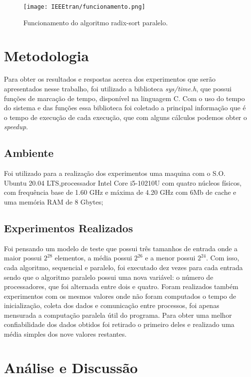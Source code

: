 \documentclass[journal]{IEEEtran}
\begin{document}
\begin{figure}[b]
    \centering
    \texttt{[image: IEEEtran/funcionamento.png]}
    \caption{Funcionamento do algoritmo radix-sort paralelo.}
    \label{fig:radix-paralel}
\end{figure}


\section{Metodologia}
\label{chapter:metodologia}


Para obter os resultados e respostas acerca dos experimentos que serão apresentados nesse trabalho, foi utilizado a biblioteca \textit{sys/time.h}, que possui funções de marcação de tempo, disponível na linguagem C. Com o uso do tempo do sistema e das funções essa biblioteca foi coletado a principal informação que é o tempo de execução de cada execução, que com alguns cálculos podemos obter o \textit{speedup}.

\subsection{Ambiente}
Foi utilizado para a realização dos experimentos uma maquina com o S.O. Ubuntu 20.04 LTS,processador Intel Core i5-10210U com quatro núcleos físicos, com frequência base de 1.60 GHz e máxima de 4.20 GHz com 6Mb de cache e uma memória RAM de 8 Gbytes;

\subsection{Experimentos Realizados}

Foi pensando um modelo de teste que possui três tamanhos de entrada onde a maior possui $2^28$ elementos, a média possui $2^26$ e a menor possui $2^24$. Com isso, cada algoritmo, sequencial e paralelo, foi executado dez vezes para cada entrada sendo que o algoritmo paralelo possui uma nova variável: o número de processadores, que foi alternada entre dois e quatro. Foram realizados também experimentos com os mesmos valores onde não foram computados o tempo de inicialização, coleta dos dados e comunicação entre processos, foi apenas mensurada a computação paralela útil do programa.
Para obter uma melhor confiabilidade dos dados obtidos foi retirado o primeiro deles e realizado uma média simples dos nove valores restantes. 


\section{Análise e Discussão}
\label{chapter:analise}
\end{document}
